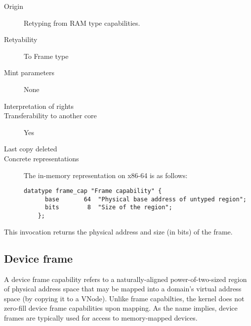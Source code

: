 \begin{description}
\item[Origin] Retyping from RAM type capabilities.
  
\item[Retyability] To Frame type
  
\item[Mint parameters] None
  
\item[Interpretation of rights] 
  
\item[Transferability to another core] Yes

\item[Last copy deleted] 
  
\item[Concrete representations] The in-memory representation on x86-64
  is as follows:
  
  \begin{lstlisting}[language=Mackerel]
    datatype frame_cap "Frame capability" {
      base       64  "Physical base address of untyped region";
      bits        8  "Size of the region";
    };
  \end{lstlisting}
\end{description}  

This invocation returns the physical address and size (in bits) of the frame.

\subsection{Device frame}
A device frame capability refers to a naturally-aligned
power-of-two-sized region of physical address space that may be mapped
into a domain's virtual address space (by copying it to a VNode).
Unlike frame capabilties, the kernel does not zero-fill device frame
capabilities upon mapping.  As the name implies, device frames are
typically used for access to memory-mapped devices.

